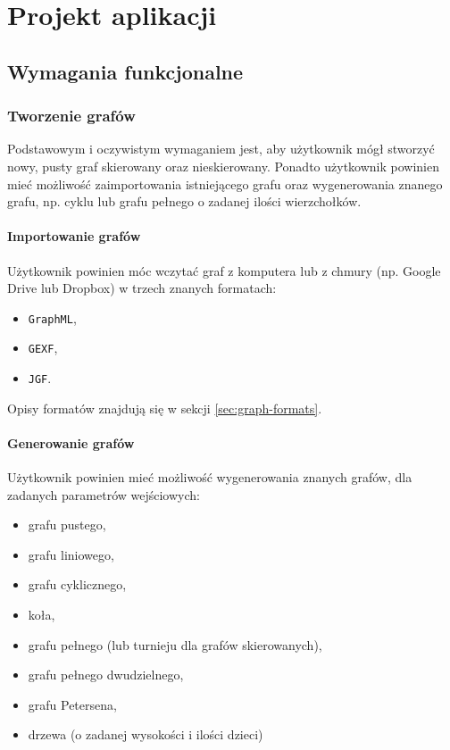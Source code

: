 \chapter{Projekt aplikacji}

\section{Wymagania funkcjonalne}

\subsection{Tworzenie grafów}
Podstawowym i oczywistym wymaganiem jest, aby użytkownik mógł stworzyć nowy, pusty graf skierowany oraz nieskierowany. Ponadto użytkownik powinien mieć możliwość zaimportowania istniejącego grafu oraz wygenerowania znanego grafu, np. cyklu lub grafu pełnego o zadanej ilości wierzchołków. 

\subsubsection{Importowanie grafów} \label{subsubsec:import}
Użytkownik powinien móc wczytać graf z komputera lub z chmury (np. Google Drive lub Dropbox) w trzech znanych formatach: 

\begin{itemize}
\setlength\itemsep{0em}
\item \texttt{GraphML},
\item \texttt{GEXF},
\item \texttt{JGF}.
\end{itemize}

Opisy formatów znajdują się w sekcji \ref{sec:graph-formats}.

\subsubsection{Generowanie grafów}

Użytkownik powinien mieć możliwość wygenerowania znanych grafów, dla zadanych parametrów wejściowych:

\begin{itemize}
\setlength\itemsep{0em}
\item grafu pustego,
\item grafu liniowego,
\item grafu cyklicznego,
\item koła,
\item grafu pełnego (lub turnieju dla grafów skierowanych),
\item grafu pełnego dwudzielnego,
\item grafu Petersena,
\item drzewa (o zadanej wysokości i ilości dzieci)
\end{itemize}

